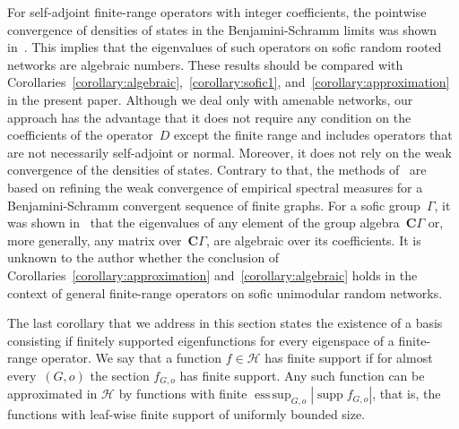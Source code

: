 \documentclass[english]{article}
\theoremstyle{definition}
\DeclareMathOperator{\supp}{supp}%
\DeclareMathOperator{\esssup}{ess\,sup} %
\newcommand*{\field}[1]{\mathbf{#1}} %
\newcommand*\C{\field{C}} %
\begin{document}
For self-adjoint finite-range operators with integer coefficients, the pointwise convergence of densities of states in the Benjamini-Schramm limits was shown in~\cite{ATV, bordenave2017spectrum}. This implies that the eigenvalues of such operators on sofic random rooted networks are algebraic numbers. These results should be compared with Corollaries~\ref{corollary:algebraic},~\ref{corollary:sofic1}, and~\ref{corollary:approximation} in the present paper.  Although we deal only with amenable networks, our approach has the advantage that it does not require any condition on the coefficients of the operator~$D$ except the finite range and includes operators that are not necessarily self-adjoint or normal. Moreover, it does not rely on the weak convergence of the densities of states. Contrary to that, the methods of~\cite{ATV, bordenave2017spectrum} are based on refining the weak convergence of empirical spectral measures for a Benjamini-Schramm convergent sequence of finite graphs. For a sofic group~$\Gamma$, it was shown in~\cite{JZ, Thom} that the eigenvalues of any element of the group algebra~$\C\Gamma$ or, more generally, any matrix over~$\C\Gamma$, are algebraic over its coefficients. It is unknown to the author whether the conclusion of Corollaries~\ref{corollary:approximation} and~\ref{corollary:algebraic} holds in the context of general finite-range operators on sofic unimodular random networks.

The last corollary that we address in this section states the existence of a basis consisting if finitely supported eigenfunctions for every eigenspace of a finite-range operator. We say that a function $f \in \mathcal{H}$ has finite support if for almost every~$(G,o)$ the section $f_{G,o}$ has finite support. Any such function can be approximated in $\mathcal{H}$ by functions with finite  $\esssup_{G,o} |\supp f_{G,o}|$, that is, the functions with leaf-wise finite support of uniformly bounded size. 
\end{document}
